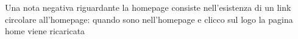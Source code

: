 Una nota negativa riguardante la homepage consiste nell'esistenza di un link circolare all'homepage: quando sono nell'homepage e clicco sul logo la pagina home viene ricaricata